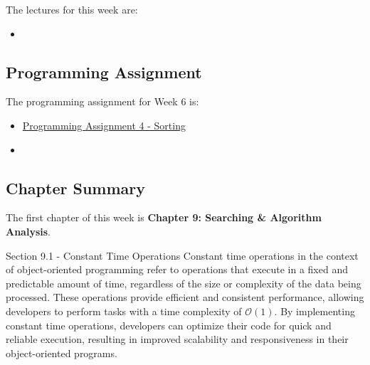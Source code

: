 \noindent The lectures for this week are:

\begin{itemize}
    \item {}
\end{itemize}

\subsection{Programming Assignment}

The programming assignment for Week 6 is:

\begin{itemize}
    \item \href{https://github.com/QuantumCompiler/CU/tree/main/CSPB%202270%20-%20Data%20Structures/Assignments/Assignment%204%20-%20Sorting%20Algorithms}{Programming Assignment 4 - Sorting}
    \item {}
\end{itemize}

\newpage

\subsection{Chapter Summary}

The first chapter of this week is \textbf{Chapter 9: Searching \& Algorithm Analysis}.

\begin{notes}{Section 9.1 - Constant Time Operations}
    Constant time operations in the context of object-oriented programming refer to operations that execute in a fixed and predictable amount of time, regardless of the size or complexity of the data being processed. These operations provide efficient and consistent performance, allowing developers to perform tasks with a time complexity of $\mathcal{O}(1)$. 
    By implementing constant time operations, developers can optimize their code for quick and reliable execution, resulting in improved scalability and responsiveness in their object-oriented programs.
\end{notes}

